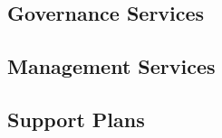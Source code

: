 \documentclass{article}%
\begin{document}
\subsection{Governance Services}
\subsection{Management Services}
\subsection{Support Plans}
\end{document}
